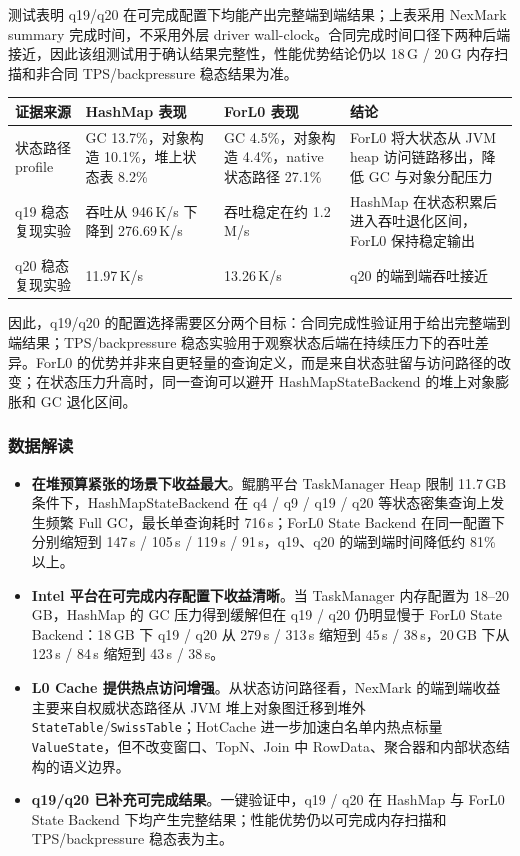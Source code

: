 \documentclass[a4paper,11pt]{article}
\newcommand{\project}{ForL0 State Backend}
\begin{document}
测试表明 q19/q20 在可完成配置下均能产出完整端到端结果；上表采用 NexMark summary 完成时间，不采用外层 driver wall-clock。合同完成时间口径下两种后端接近，因此该组测试用于确认结果完整性，性能优势结论仍以 18\,G / 20\,G 内存扫描和非合同 TPS/backpressure 稳态结果为准。

\begin{center}
\small
\setlength{\tabcolsep}{4pt}
\begin{tabularx}{\textwidth}{L{3.0cm} L{4.0cm} L{4.0cm} X}
\toprule
\textbf{证据来源} & \textbf{HashMap 表现} & \textbf{ForL0 表现} & \textbf{结论} \\
\midrule
状态路径 profile & GC 13.7\%，对象构造 10.1\%，堆上状态表 8.2\% & GC 4.5\%，对象构造 4.4\%，native 状态路径 27.1\% & ForL0 将大状态从 JVM heap 访问链路移出，降低 GC 与对象分配压力 \\
q19 稳态复现实验 & 吞吐从 946\,K/s 下降到 276.69\,K/s & 吞吐稳定在约 1.2\,M/s & HashMap 在状态积累后进入吞吐退化区间，ForL0 保持稳定输出 \\
q20 稳态复现实验 & 11.97\,K/s & 13.26\,K/s & q20 的端到端吞吐接近 \\
\bottomrule
\end{tabularx}
\end{center}

因此，q19/q20 的配置选择需要区分两个目标：合同完成性验证用于给出完整端到端结果；TPS/backpressure 稳态实验用于观察状态后端在持续压力下的吞吐差异。ForL0 的优势并非来自更轻量的查询定义，而是来自状态驻留与访问路径的改变；在状态压力升高时，同一查询可以避开 HashMapStateBackend 的堆上对象膨胀和 GC 退化区间。

\subsubsection{数据解读}

\begin{itemize}
  \item \textbf{在堆预算紧张的场景下收益最大}。鲲鹏平台 TaskManager Heap 限制 11.7\,GB 条件下，HashMapStateBackend 在 q4 / q9 / q19 / q20 等状态密集查询上发生频繁 Full GC，最长单查询耗时 716\,s；\project{} 在同一配置下分别缩短到 147\,s / 105\,s / 119\,s / 91\,s，q19、q20 的端到端时间降低约 81\% 以上。
  \item \textbf{Intel 平台在可完成内存配置下收益清晰}。当 TaskManager 内存配置为 18--20\,GB，HashMap 的 GC 压力得到缓解但在 q19 / q20 仍明显慢于 \project{}：18\,GB 下 q19 / q20 从 279\,s / 313\,s 缩短到 45\,s / 38\,s，20\,GB 下从 123\,s / 84\,s 缩短到 43\,s / 38\,s。
  \item \textbf{L0 Cache 提供热点访问增强}。从状态访问路径看，NexMark 的端到端收益主要来自权威状态路径从 JVM 堆上对象图迁移到堆外 \texttt{StateTable}/\texttt{SwissTable}；HotCache 进一步加速白名单内热点标量 \texttt{ValueState}，但不改变窗口、TopN、Join 中 RowData、聚合器和内部状态结构的语义边界。
  \item \textbf{q19/q20 已补充可完成结果}。一键验证中，q19 / q20 在 HashMap 与 \project{} 下均产生完整结果；性能优势仍以可完成内存扫描和 TPS/backpressure 稳态表为主。
\end{itemize}
\end{document}
